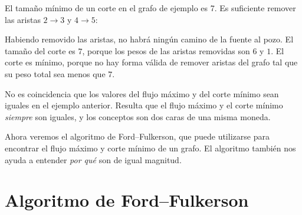 El tamaño mínimo de un corte en el grafo de ejemplo es 7. Es suficiente
remover las aristas $2 \rightarrow 3$ y $4 \rightarrow 5$:

\begin{center}
\end{center}

Habiendo removido las aristas, no habrá ningún camino de la fuente
al pozo. El tamaño del corte es $7$, porque los pesos de las aristas
removidas son $6$ y $1$. El corte es mínimo, porque no hay forma
válida de remover aristas del grafo tal que su peso total sea
menos que $7$.

No es coincidencia que los valores del flujo máximo y del corte mínimo
sean iguales en el ejemplo anterior. Resulta que el flujo máximo y el
corte mínimo \emph{siempre} son iguales, y los conceptos son dos caras
de una misma moneda.

Ahora veremos el algoritmo de Ford--Fulkerson, que puede utilizarse
para encontrar el flujo máximo y corte mínimo de un grafo. El algoritmo
también nos ayuda a entender \emph{por qué} son de igual magnitud.

\section{Algoritmo de Ford--Fulkerson}

